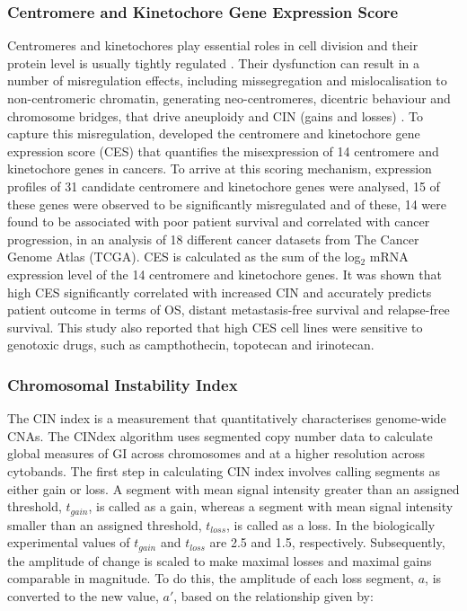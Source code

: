 \subsubsection{Centromere and Kinetochore Gene Expression Score}
Centromeres and kinetochores play essential roles in cell division and their protein level is usually tightly regulated \citep{pmid19002142}. Their dysfunction can result in a number of misregulation effects, including missegregation and mislocalisation to non-centromeric chromatin, generating neo-centromeres, dicentric behaviour and chromosome bridges, that drive aneuploidy and CIN (gains and losses) \citep{pmid19002142, pmid27577169}. To capture this misregulation, \cite{pmid27577169} developed the centromere and kinetochore gene expression score (CES) that quantifies the misexpression of 14 centromere and kinetochore genes in cancers. To arrive at this scoring mechanism, expression profiles of 31 candidate centromere and kinetochore genes were analysed, 15 of these genes were observed to be significantly misregulated and of these, 14 were found to be associated with poor patient survival and correlated with cancer progression, in an analysis of 18 different cancer datasets from The Cancer Genome Atlas (TCGA). CES is calculated as the sum of the log$_2$ mRNA expression level of the 14 centromere and kinetochore genes. It was shown that high CES significantly correlated with increased CIN and accurately predicts patient outcome in terms of OS, distant metastasis-free survival and relapse-free survival. This study also reported that high CES cell lines were sensitive to genotoxic drugs, such as campthothecin, topotecan and irinotecan.

\subsubsection{Chromosomal Instability Index}
The CIN index is a measurement that quantitatively characterises genome-wide CNAs. The CINdex algorithm uses segmented copy number data to calculate global measures of GI across chromosomes and at a higher resolution across cytobands. The first step in calculating CIN index involves calling segments as either gain or loss. A segment with mean signal intensity greater than an assigned threshold, $t_{gain}$, is called as a gain, whereas a segment with mean signal intensity smaller than an assigned threshold, $t_{loss}$, is called as a loss. In \cite{pmid29343938} the biologically experimental values of $t_{gain}$ and $t_{loss}$ are 2.5 and 1.5, respectively. Subsequently, the amplitude of change is scaled to make maximal losses and maximal gains comparable in magnitude. To do this, the amplitude of each loss segment, $a$, is converted to the new value, $a'$, based on the relationship given by: 


